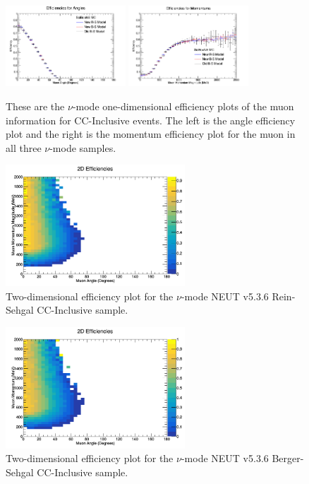 \documentclass[11pt]{article}
\begin{document}
\begin{figure}[H]
\centering
\includegraphics[width=0.4\textwidth]{NMCombinedPlotsImages/22-NMCombinedPlots.png}
\includegraphics[width=0.4\textwidth]{NMCombinedPlotsImages/23-NMCombinedPlots.png}
\caption{These are the $\nu$-mode one-dimensional efficiency plots of the muon information for CC-Inclusive events. The left is the angle efficiency plot and the right is the momentum efficiency plot for the muon in all three $\nu$-mode samples.}
\label{fig:app:NMCCInclusive1DEff}
\end{figure}

\begin{figure}[H]
\centering
\includegraphics[width=0.6\textwidth]{CCInclusivePlots/2DEffCompareNMRS.png}
\caption{Two-dimensional efficiency plot for the $\nu$-mode NEUT v5.3.6 Rein-Sehgal CC-Inclusive sample.}
\label{fig:app:NMCCInclusiveMuon2DEffRS}
\end{figure}

\begin{figure}[H]
\centering
\includegraphics[width=0.6\textwidth]{CCInclusivePlots/2DEffCompareNMBS.png}
\caption{Two-dimensional efficiency plot for the $\nu$-mode NEUT v5.3.6 Berger-Sehgal CC-Inclusive sample.}
\label{fig:app:NMCCInclusiveMuon2DEffBS}
\end{figure}
\end{document}
